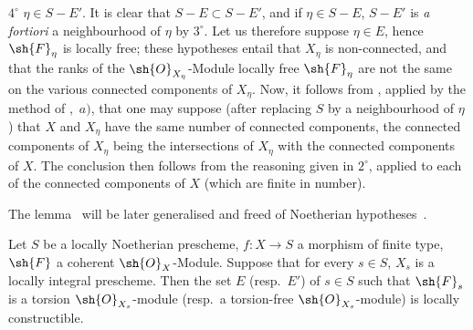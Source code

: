 $4^\circ$ $\eta\in S-E'$.
It is clear that $S-E\subset S-E'$, and if $\eta\in S-E$, $S-E'$ is \emph{a fortiori} a neighbourhood of $\eta$ by $3^\circ$.
Let us therefore suppose $\eta\in E$, hence $\sh{F}_\eta$ is locally free; these hypotheses entail that $X_\eta$ is non-connected, and that the ranks of the $\sh{O}_{X_\eta}$-Module locally free $\sh{F}_\eta$ are not the same on the various connected components of $X_\eta$.
Now, it follows from , applied by the method of ,~$a)$, that one may suppose (after replacing $S$ by a neighbourhood of $\eta$) that $X$ and $X_\eta$ have the same number of connected components, the connected components of $X_\eta$ being the intersections of $X_\eta$ with the connected components of $X$.
The conclusion then follows from the reasoning given in $2^\circ$, applied to each of the connected components of $X$ (which are finite in number).

\begin{remark}[9.4.7.2]
\label{IV.9.4.7.2}
The lemma~ will be later generalised and freed of Noetherian hypotheses~.
\end{remark}

\begin{proposition}[9.4.8]
\label{IV.9.4.8}
Let $S$ be a locally Noetherian prescheme, $f:X\to S$ a morphism of finite type, $\sh{F}$ a coherent $\sh{O}_X$-Module.
Suppose that for every $s\in S$, $X_s$ is a locally integral prescheme.
Then the set $E$ \textnormal{(}resp.\ $E'$\textnormal{)} of $s\in S$ such that $\sh{F}_s$ is a torsion $\sh{O}_{X_s}$-module \textnormal{(}resp.\ a torsion-free $\sh{O}_{X_s}$-module\textnormal{)} is locally constructible.
\end{proposition}

